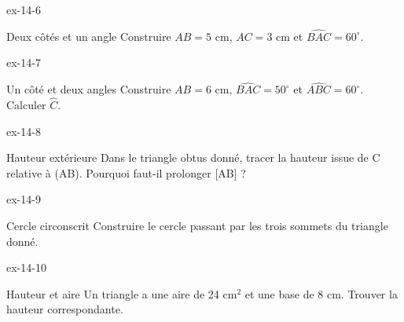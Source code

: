 \begin{blocLivre}{ex-14-6}\begin{exercice}[2]{Deux côtés et un angle}
Construire $AB=5$ cm, $AC=3$ cm et $\widehat{BAC}=60^\circ$.
\label{fig-ex-14-6}
\end{exercice}\end{blocLivre}
\begin{blocLivre}{ex-14-7}\begin{exercice}[2]{Un côté et deux angles}
Construire $AB=6$ cm, $\widehat{BAC}=50^\circ$ et $\widehat{ABC}=60^\circ$. Calculer $\widehat C$.
\label{fig-ex-14-7}
\end{exercice}\end{blocLivre}
\begin{blocLivre}{ex-14-8}\begin{exercice}[2]{Hauteur extérieure}
Dans le triangle obtus donné, tracer la hauteur issue de C relative à (AB). Pourquoi faut-il prolonger [AB] ?
\label{fig-ex-14-8}
\end{exercice}\end{blocLivre}
\begin{blocLivre}{ex-14-9}\begin{exercice}[2]{Cercle circonscrit}
Construire le cercle passant par les trois sommets du triangle donné.
\label{fig-ex-14-9}
\end{exercice}\end{blocLivre}
\begin{blocLivre}{ex-14-10}\begin{exercice}[2]{Hauteur et aire}
Un triangle a une aire de 24 cm$^2$ et une base de 8 cm. Trouver la hauteur correspondante.
\label{fig-ex-14-10}
\end{exercice}\end{blocLivre}

